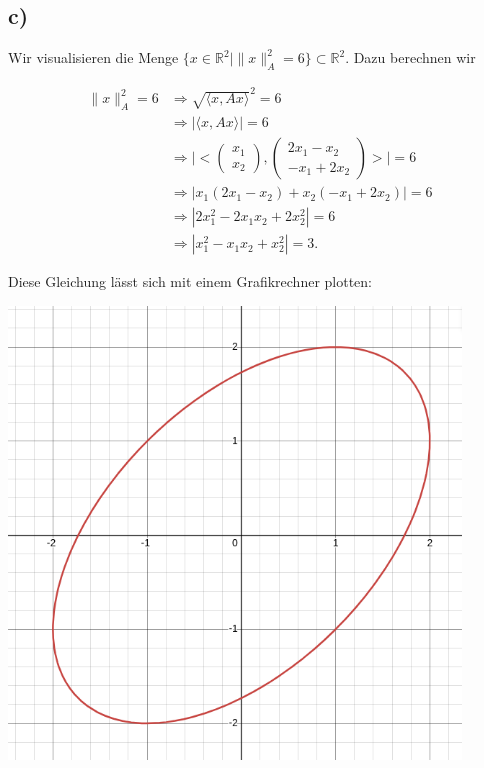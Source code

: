 \documentclass{article}
\newcommand{\RR}{\mathbb{R}}
\begin{document}
 \newpage

 \subsection*{c)}
 Wir visualisieren die Menge
 $\{ x \in \RR^2 | \| x \|_A^2 = 6\} \subset \RR^2$.
 Dazu berechnen wir
 
 \[
  \begin{aligned}
    \| x \|_A^2 = 6
    &\Rightarrow 
    \sqrt{\langle x,Ax \rangle}^2 = 6
    \\ &\Rightarrow
    | \langle x,Ax \rangle| = 6
    \\ &\Rightarrow
    \bigg|\biggl< \begin{pmatrix}
      x_1 \\x_2 
    \end{pmatrix}
    ,\begin{pmatrix} 
      2x_1 - x_2 \\ - x_1 + 2x_2
      \end{pmatrix}
      \biggr>\bigg| = 6
      \\ &\Rightarrow
      |x_1(2x_1 - x_2) + x_2( - x_1 + 2x_2) | = 6
      \\ &\Rightarrow
      |2x_1^2 - 2 x_1x_2 + 2x_2^2| = 6
      \\ &\Rightarrow
      |x_1^2 - x_1x_2 + x_2^2 | = 3.
  \end{aligned}
 \]

 Diese Gleichung lässt sich mit einem Grafikrechner plotten:

 \includegraphics*[width=0.9\textwidth]{circle.png}
\end{document}
